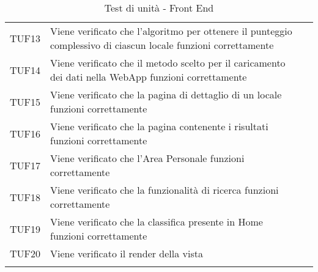\begin{longtable}{ m{}<{\centering}  m{}<{\centering}  m{}<{\centering} }
	TUF13 & Viene verificato che l'algoritmo per ottenere il punteggio complessivo di ciascun locale funzioni correttamente & \Ni \\
	TUF14 & Viene verificato che il metodo scelto per il caricamento dei dati nella WebApp funzioni correttamente & \Ni \\
	TUF15 & Viene verificato che la pagina di dettaglio di un locale funzioni correttamente & \Ni \\
	TUF16 & Viene verificato che la pagina contenente i risultati funzioni correttamente & \Ni \\
	TUF17 & Viene verificato che l'Area Personale funzioni correttamente & \Ni \\
	TUF18 & Viene verificato che la funzionalità di ricerca funzioni correttamente & \Ni \\
	TUF19 & Viene verificato che la classifica presente in Home funzioni correttamente & \Ni \\
	TUF20 & Viene verificato il render della vista & \Ni \\

    \caption{Test di unità - Front End}
\end{longtable}	

%
%	 
%	
%

